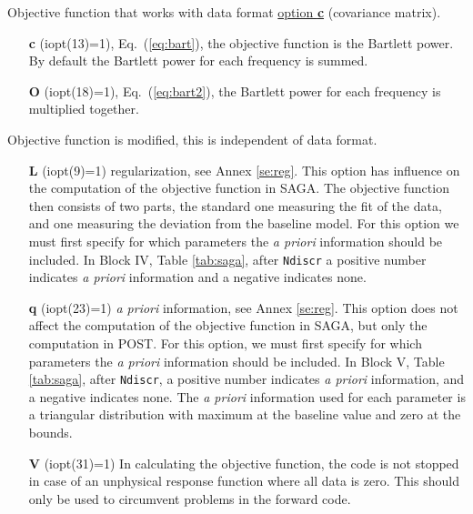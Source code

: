 \documentclass{saclantc}
\begin{document}
Objective function that works with data format \underline{option {\bf c}}
(covariance matrix).
\vspace{-0.6cm}
\begin{itemize}
 \item[{\bf c}] (iopt(13)=1), Eq.\ (\ref{eq:bart}), 
        the objective function is the Bartlett power.
         By default the Bartlett power for each frequency is summed.
\vspace{-0.3cm}
    \item[{\bf O}] (iopt(18)=1),  Eq.\ (\ref{eq:bart2}),  
           the Bartlett power for each frequency is multiplied together.
\end{itemize}

Objective function is modified, this is independent of  data format.
\vspace{-0.6cm}
\begin{itemize}
    \item[{\bf L}] (iopt(9)=1)    regularization, see Annex
\ref{se:reg}. This
option  has influence on the computation of  the objective function in
{\sf SAGA}. The objective function then consists of two parts, the
standard one measuring the fit of the data, and one
measuring the deviation from the baseline model. For this option
we must first specify for which parameters the {\it a
priori} information should be included. In Block IV, Table
\ref{tab:saga}, after {\tt Ndiscr}  a positive number indicates 
{\it a priori} information and a negative indicates none.
\vspace{-0.3cm}
    \item[{\bf q}] (iopt(23)=1)    {\it a priori} information, 
see Annex \ref{se:reg}. This
option does not affect the computation of the objective function in
{\sf SAGA}, but only the computation in {\sf POST}. For this option,
we must first specify for which parameters  the {\it a
priori} information should be included. In Block V, Table
\ref{tab:saga}, after {\tt Ndiscr},  a positive number indicates 
{\it a priori} information, and a negative indicates none.
The {\it a priori } information used for each parameter
 is a triangular distribution
with maximum at the baseline value and zero at the bounds.
    \item[{\bf V}] (iopt(31)=1)    In calculating the objective function, the code is not stopped in case of an unphysical response function where all data is zero. This should only be used to circumvent problems in the forward code.
\end{itemize}
\end{document}
